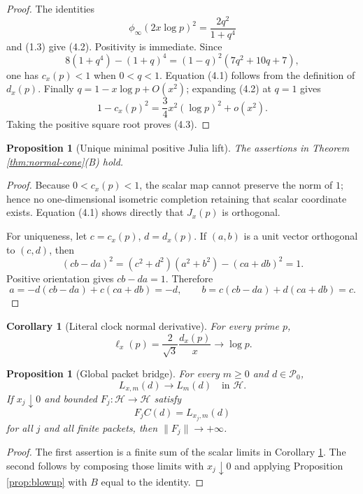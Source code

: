 \documentclass[11pt]{article}
\newtheorem{proposition}[theorem]{Proposition}
\newtheorem{corollary}[theorem]{Corollary}
\theoremstyle{definition}
\theoremstyle{remark}
\newcommand{\cH}{\mathcal H}
\newcommand{\cP}{\mathcal P}
\begin{document}
\begin{proof}
The identities
\[
 \phi_\infty(2x\log p)^2=\frac{2q^2}{1+q^4}
\]
and (1.3) give (4.2).  Positivity is immediate.  Since
\[
 8(1+q^4)-(1+q)^4=(1-q)^2(7q^2+10q+7),             \tag{4.4}
\]
one has \(c_x(p)<1\) when \(0<q<1\).  Equation (4.1) follows from the definition of \(d_x(p)\).
Finally \(q=1-x\log p+O(x^2)\); expanding (4.2) at \(q=1\) gives
\[
 1-c_x(p)^2=\frac34x^2(\log p)^2+o(x^2).
\]
Taking the positive square root proves (4.3).
\end{proof}

\begin{proposition}[Unique minimal positive Julia lift]\label{prop:minimal}
The assertions in Theorem \ref{thm:normal-cone}\textup{(B)} hold.
\end{proposition}

\begin{proof}
Because \(0<c_x(p)<1\), the scalar map cannot preserve the norm of \(1\); hence no
one-dimensional isometric completion retaining that scalar coordinate exists.  Equation (4.1)
shows directly that \(J_x(p)\) is orthogonal.

For uniqueness, let \(c=c_x(p)\), \(d=d_x(p)\).  If \((a,b)\) is a unit vector orthogonal to
\((c,d)\), then
\[
 (cb-da)^2=(c^2+d^2)(a^2+b^2)-(ca+db)^2=1.
\]
Positive orientation gives \(cb-da=1\).  Therefore
\[
 a=-d(cb-da)+c(ca+db)=-d,\qquad
 b=c(cb-da)+d(ca+db)=c.
\]
\end{proof}

\begin{corollary}[Literal clock normal derivative]\label{cor:clock}
For every prime \(p\),
\[
 \ell_x(p)=\frac{2}{\sqrt3}\frac{d_x(p)}x
 \longrightarrow\log p.
\]
\end{corollary}

\begin{proposition}[Global packet bridge]\label{prop:packet}
For every \(m\ge0\) and \(d\in\cP_0\),
\[
 L_{x,m}(d)\longrightarrow L_m(d)
\quad\text{in }\cH.
\]
If \(x_j\downarrow0\) and bounded \(F_j:\cH\to\cH\) satisfy
\[
 F_jC(d)=L_{x_j,m}(d)
\]
for all \(j\) and all finite packets, then \(\|F_j\|\to+\infty\).
\end{proposition}

\begin{proof}
The first assertion is a finite sum of the scalar limits in Corollary \ref{cor:clock}.  The
second follows by composing those limits with \(x_j\downarrow0\) and applying Proposition
\ref{prop:blowup} with \(B\) equal to the identity.
\end{proof}
\end{document}
